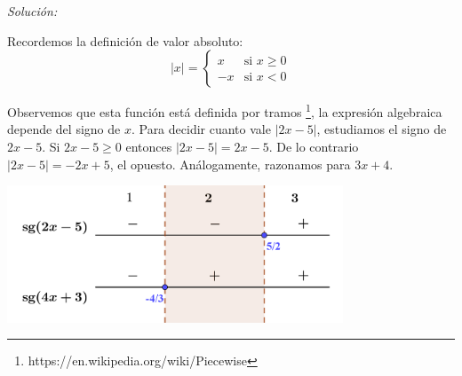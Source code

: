 \documentclass[10pt,a4paper]{article}
\begin{document}
\noindent
\emph{Solución:}

\noindent
Recordemos la definición de valor absoluto:
\begin{equation*}
  \vert x \vert =
  \begin{cases}
    x & \mbox{si } x\geq 0 \\
   -x & \mbox{si } x < 0
  \end{cases}
\end{equation*}

\noindent
Observemos que esta función está definida por tramos
\footnote{https://en.wikipedia.org/wiki/Piecewise},
la expresión algebraica depende del signo de $x$.
Para decidir cuanto vale $|2x - 5|$, estudiamos el signo de $2x-5$.
Si $2x-5 \geq 0$ entonces $|2x-5| = 2x-5$. De lo contrario $|2x-5| = -2x+5$,
el opuesto. Análogamente, razonamos para $ 3x+4$.

\begin{center}
\includegraphics[width=100mm]{signo}
\end{center}

\newpage
\end{document}
